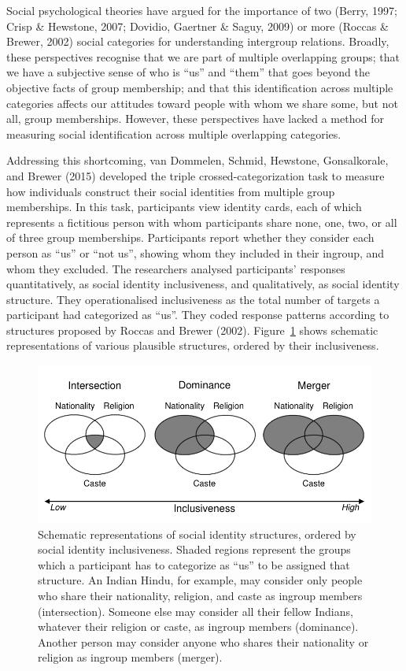 \documentclass[12pt, a4paper]{article}
\begin{document}
Social psychological theories have argued for the importance of two (Berry, 1997; Crisp \& Hewstone, 2007; Dovidio, Gaertner \& Saguy, 2009) or more (Roccas \& Brewer, 2002) social categories for understanding intergroup relations. Broadly, these perspectives recognise that we are part of multiple overlapping groups; that we have a subjective sense of who is ``us'' and ``them'' that goes beyond the objective facts of group membership; and that this identification across multiple categories affects our attitudes toward people with whom we share some, but not all, group memberships. However, these perspectives have lacked a method for measuring social identification across multiple overlapping categories.

Addressing this shortcoming, van Dommelen, Schmid, Hewstone, Gonsalkorale, and Brewer (2015) developed the triple crossed-categorization task to measure how individuals construct their social identities from multiple group memberships. In this task, participants view identity cards, each of which represents a fictitious person with whom participants share none, one, two, or all of three group memberships. Participants report whether they consider each person as ``us'' or ``not us'', showing whom they included in their ingroup, and whom they excluded. The researchers analysed participants' responses quantitatively, as social identity inclusiveness, and qualitatively, as social identity structure. They operationalised inclusiveness as the total number of targets a participant had categorized as ``us''. They coded response patterns according to structures proposed by Roccas and Brewer (2002). Figure~\ref{fig:f1} shows schematic representations of various plausible structures, ordered by their inclusiveness.

\begin{figure}
\centering
\includegraphics[scale=1]{../figures/figure-1}
\caption{
Schematic representations of social identity structures, ordered by social identity inclusiveness. Shaded regions represent the groups which a participant has to categorize as ``us'' to be assigned that structure. An Indian Hindu, for example, may consider only people who share their nationality, religion, and caste as ingroup members (intersection). Someone else may consider all their fellow Indians, whatever their religion or caste, as ingroup members (dominance). Another person may consider anyone who shares their nationality or religion as ingroup members (merger). %
}
\label{fig:f1}
\end{figure}
\end{document}
